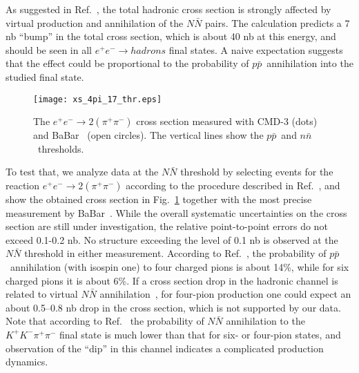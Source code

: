 \documentclass[12pt]{elsarticle}
\def\epem {\ensuremath{e^+ e^-}}
\def\pipi {\ensuremath{\pi^+\pi^-}}
\def\ppbar {\ensuremath{p\bar p}}
\def\nnbar {\ensuremath{n\bar n}}
\def\NNbar {\ensuremath{N\bar N}}
\begin{document}
As suggested in Ref.~\cite{Milst3}, the total hadronic cross section is  
strongly affected by virtual production and annihilation of the $\NNbar$ pairs. 
The calculation predicts a 7 nb ``bump'' in the total cross section, 
which is about 40 nb at this energy, and should be seen in all 
$\epem\to hadrons$ final states. A naive expectation suggests that the 
effect could be proportional to the  probability of \ppbar~annihilation 
into the studied final state.
%
\begin{center}
\begin{figure}[tbh]
\vspace{-0.2cm}
\texttt{[image: xs\_4pi\_17\_thr.eps]}
\vspace{-0.5cm}
\caption
{
The $e^+e^-\to 2(\pi^+\pi^-)$ cross section measured with CMD-3 (dots) and 
BaBar~\cite{isr4pi} (open circles). The vertical lines show the \ppbar~and 
\nnbar~thresholds.
}
\label{xs4pi}
\end{figure}
\end{center}
%
To test that, we analyze data at the $\NNbar$ threshold by selecting events 
for the reaction $\epem\to 2(\pipi)$ according to the procedure described in 
Ref.~\cite{cmd4pi}, and show the obtained cross section in Fig.~\ref{xs4pi} 
together with the most precise measurement by BaBar~\cite{isr4pi}. 
While the overall systematic uncertainties on the cross section are still 
under investigation, the relative point-to-point errors do not exceed 
0.1-0.2 nb. No structure exceeding the level of 0.1 nb is observed 
at the $\NNbar$ threshold 
in either measurement. According to Ref.~\cite{ppbarreview}, the 
probability of \ppbar~annihilation (with isospin one) to four charged pions is 
about 14\%, while for six charged pions it is about 6\%. If a cross section 
drop in the hadronic channel is related to virtual 
$\NNbar$ annihilation~\cite{Milst3}, for four-pion production one could expect 
an about 0.5--0.8 nb drop in the cross section, which is not supported by our 
data. Note that according to Ref.~\cite{ppbarreview} the probability of
$\NNbar$ annihilation to the $K^+K^-\pi^+\pi^-$ final state is much
lower than that for six- or four-pion states, and observation of the
``dip'' in this channel indicates a complicated production dynamics.
%
\end{document}
